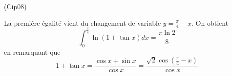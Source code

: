 \begin{tiny}(Cip08)\end{tiny} La première égalité vient du changement de variable $y=\frac{\pi}{4}-x$. On obtient
\begin{displaymath}
 \int_{0}^{\frac{\pi}{4}}\ln(1+\tan x)dx  = \frac{\pi \ln 2}{8}
\end{displaymath}
en remarquant que
\begin{displaymath}
 1+\tan x = \frac{\cos x + \sin x }{\cos x}=\frac{\sqrt2 \cos(\frac{\pi}{4}-x)}{\cos x}
\end{displaymath}
